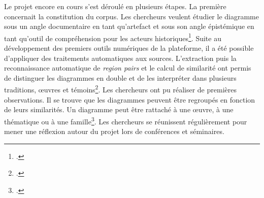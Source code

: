 Le projet encore en cours s'est déroulé en plusieurs étapes. La première concernait la constitution du corpus. Les chercheurs veulent étudier le diagramme sous un angle documentaire en tant qu'artefact et sous son angle épistémique en tant qu'outil de compréhension pour les acteurs historiques\footcite{Conference2023EIDA2023}. Suite au développement des premiers outils numériques de la plateforme, il a été possible d'appliquer des traitements automatiques aux sources. L'extraction puis la reconnaissance automatique de \textit{region pairs} et le calcul de similarité ont permis de distinguer les diagrammes en double et de les interpréter dans plusieurs traditions, œuvres et témoins\footcite{Conference2024Graphic2024}. Les chercheurs ont pu réaliser de premières observations. Il se trouve que les diagrammes peuvent être regroupés en fonction de leurs similarités. Un diagramme peut être rattaché à une œuvre, à une thématique ou à une famille\footcite{Conference2025Long2025}. Les chercheurs se réunissent régulièrement pour mener une réflexion autour du projet lors de conférences et séminaires. 
 





 